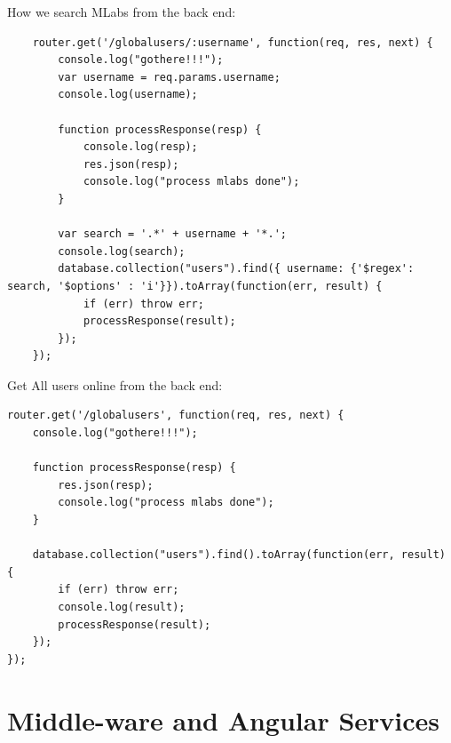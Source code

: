 How we search MLabs from the back end:
\begin{lstlisting}
    router.get('/globalusers/:username', function(req, res, next) {
        console.log("gothere!!!");
        var username = req.params.username;
        console.log(username);
    
        function processResponse(resp) {
            console.log(resp);
            res.json(resp);
            console.log("process mlabs done");
        }
    
        var search = '.*' + username + '*.';
        console.log(search);
        database.collection("users").find({ username: {'$regex': search, '$options' : 'i'}}).toArray(function(err, result) {
            if (err) throw err;
            processResponse(result);
        });
    });
\end{lstlisting}
Get All users online from the back end:
\begin{lstlisting}
router.get('/globalusers', function(req, res, next) {
    console.log("gothere!!!");

    function processResponse(resp) {
        res.json(resp);
        console.log("process mlabs done");
    }

    database.collection("users").find().toArray(function(err, result) {
        if (err) throw err;
        console.log(result);
        processResponse(result);
    });
});
\end{lstlisting}


\section{Middle-ware and Angular Services}

